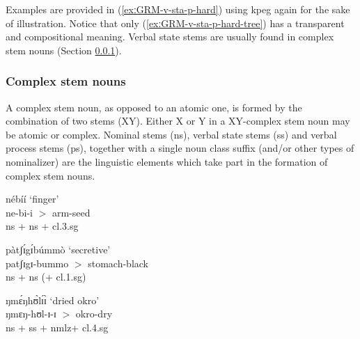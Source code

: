 \begin{exe}
\begin{exe}
\begin{exe}
{\begin{exe}
\begin{exe}
\begin{exe}
\begin{exe}
 Examples  are provided in
(\ref{exːGRM-v-sta-p-hard}) using  {\sls kpeg} again for
the sake of illustration.  Notice that only (\ref{exːGRM-v-sta-p-hard-tree}) has
a transparent and compositional meaning. Verbal state stems are 
usually found in complex stem nouns (Section \ref{sec:GRM-com-stem-noun}). 










 


\subsubsection{Complex stem nouns}
\label{sec:GRM-com-stem-noun}


A  complex stem noun, as opposed to an atomic one,  is formed by the
combination of two stems (XY). Either X or Y in a  XY-complex stem noun may be 
atomic or complex.  Nominal stems ({\sc ns}), verbal state stems ({\sc ss}) and
verbal process stems ({\sc ps}), together with a single noun class  suffix 
(and/or other
types of nominalizer) are
the linguistic elements which take part in the
formation of complex stem nouns. 


\ea\label{exːGRM-cplx-stm}
 

  \ea\label{exːGRM-cplx-stm-NS-NS-1}%
{\sls nébíí} {\rm  `finger'}\\  %
ne-bi-i  $>$  {\sc arm-seed}\\%
 {\sc ns} + {\sc ns} + {\sc cl.3.sg}
 

  \ex\label{exːGRM-cplx-stm-NS-NS-2}
 {\sls pàtʃɪ́gɪ́búmmò} {\rm  `secretive'}\\ %
patʃɪgɪ-bummo  $>$  {\sc stomach-black}\\  %
 {\sc ns} + {\sc ns} (+ {\sc cl.1.sg})

 \ex\label{exːGRM-cplx-stm-NS-SS}
 {\sls ŋmɛ́ŋhʊ̀lɪ́ɪ̀} {\rm   `dried okro'}\\ %
ŋmɛŋ-hʊl-ɪ-ɪ $>$   {\sc okro-dry}\\  %
 {\sc ns} + {\sc ss} + {\sc nmlz}+ {\sc cl.4.sg}
 

\end{exe}
\end{exe}
\end{exe}
\end{exe}}
\end{exe}
\end{exe}
\end{exe}

